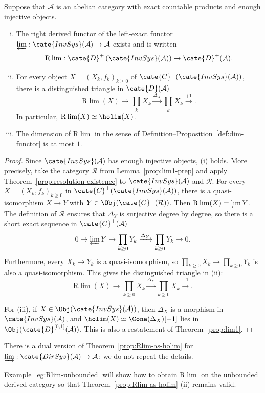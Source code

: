 \begin{theorem}\label{prop:Rlim-as-holim}
	Suppose that $\mathcal{A}$ is an abelian category with exact countable
	products and enough injective objects.
	\begin{enumerate}[(i)]
		\item The right derived functor of the left-exact functor
		$\varprojlim:\cate{InvSys}(\mathcal{A})\to\mathcal{A}$ exists and is
		written
		\[ \mathrm{R}\lim :  \cate{D}^+\left(\cate{InvSys}(\mathcal{A})\right) \to \cate{D}^+(\mathcal{A}) . \]
		\item For every object $X=(X_k,f_k)_{k\geq0}$ of
		$\cate{C}^+(\cate{InvSys}(\mathcal{A}))$, there is a distinguished
		triangle in $\cate{D}(\mathcal{A})$
		\[ \mathrm{R}\lim(X) \to \prod_k X_k \xrightarrow{\Delta_X} \prod_k X_k \xrightarrow{+1}. \]
		In particular, $\mathrm{R}\lim(X)\simeq\holim(X)$.
		\item The dimension of $\mathrm{R}\lim$ in the sense of
		Definition--Proposition~\ref{def:dim-functor} is at most $1$.
	\end{enumerate}
\end{theorem}
\begin{proof}
	Since $\cate{InvSys}(\mathcal{A})$ has enough injective objects, (i) holds.
	More precisely, take the category $\mathcal{R}$ from
	Lemma~\ref{prop:lim1-prep} and apply
	Theorem~\ref{prop:resolution-existence} to
	$\cate{InvSys}(\mathcal{A})$ and $\mathcal{R}$. For every
	$X=(X_k,f_k)_{k\geq0}$ in
	$\cate{C}^+(\cate{InvSys}(\mathcal{A}))$, there is a quasi-isomorphism
	$X\to Y$ with $Y\in\Obj(\cate{C}^+(\mathcal{R}))$. Then
	$\mathrm{R}\lim(X)=\varprojlim Y$. The definition of $\mathcal{R}$ ensures
	that $\Delta_Y$ is surjective degree by degree, so there is a short exact
	sequence in $\cate{C}^+(\mathcal{A})$
	\[ 0 \to \varprojlim Y \to \prod_{k \geq 0} Y_k \xrightarrow{\Delta_Y} \prod_{k \geq 0} Y_k \to 0. \]
	Furthermore, every $X_k\to Y_k$ is a quasi-isomorphism, so
	$\prod_{k\geq0}X_k\to\prod_{k\geq0}Y_k$ is also a quasi-isomorphism. This
	gives the distinguished triangle in (ii):
	\[ \mathrm{R}\lim(X) \to \prod_{k \geq 0} X_k \xrightarrow{\Delta_X} \prod_{k \geq 0} X_k \xrightarrow{+1} . \]

	For (iii), if $X\in\Obj(\cate{InvSys}(\mathcal{A}))$, then $\Delta_X$ is
	a morphism in $\cate{InvSys}(\mathcal{A})$, and
	$\holim(X)\simeq\Cone(\Delta_X)[-1]$ lies in
	$\Obj(\cate{D}^{[0,1]}(\mathcal{A}))$. This is also a restatement of
	Theorem~\ref{prop:lim1}.
\end{proof}

There is a dual version of Theorem~\ref{prop:Rlim-as-holim} for
$\varinjlim:\cate{DirSys}(\mathcal{A})\to\mathcal{A}$; we do not repeat the
details.

Example~\ref{eg:Rlim-unbounded} will show how to obtain
$\mathrm{R}\lim$ on the unbounded derived category so that
Theorem~\ref{prop:Rlim-as-holim} (ii) remains valid.
